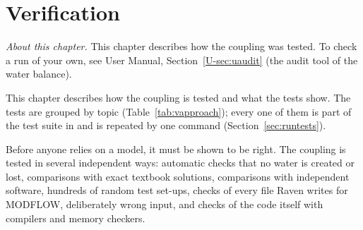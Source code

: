 \chapter{Verification}\label{ch:c8}\label{ch:verification}
\noindent\emph{About this chapter.} This chapter describes how the coupling was tested. To check a run of
your own, see User Manual, Section~\ref{U-sec:uaudit} (the audit tool of the water balance).

This chapter describes how the coupling is tested and what the tests show. The tests are grouped by topic
(Table~\ref{tab:vapproach}); every one of them is part of the test suite in  and is repeated by one command
(Section~\ref{sec:runtests}).

\begin{plain}
Before anyone relies on a model, it must be shown to be right. The coupling is tested in several independent ways:
automatic checks that no water is created or lost, comparisons with exact textbook solutions, comparisons with independent
software, hundreds of random test set-ups, checks of every file Raven writes for MODFLOW, deliberately wrong input, and
checks of the code itself with compilers and memory checkers.
\end{plain}


